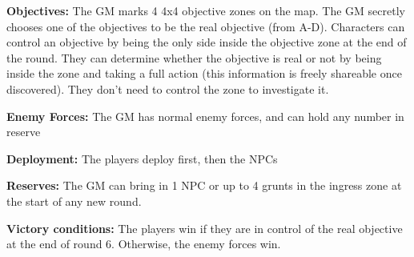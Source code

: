  \textbf{Objectives:} The GM marks 4 4x4 objective zones on the map. The GM secretly chooses one of the objectives to be the real objective (from A-D). Characters can control an objective by being the only side inside the objective zone at the end of the round. They can determine whether the objective is real or not by being inside the zone and taking a full action (this information is freely shareable once discovered). They don’t need to control the zone to investigate it.

 \textbf{Enemy Forces:} The GM has normal enemy forces, and can hold any number in reserve

 \textbf{Deployment:} The players deploy first, then the NPCs

 \textbf{Reserves:} The GM can bring in 1 NPC or up to 4 grunts in the ingress zone at the start of any new round. 

 \textbf{Victory conditions:} The players win if they are in control of the real objective at the end of round 6. Otherwise, the enemy forces win.
